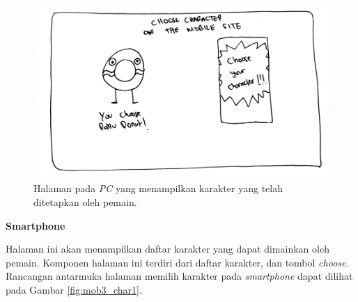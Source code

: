 \begin{enumerate}
\begin{figure}[H]
	\centering
	\includegraphics[scale=0.1]{Gambar/web3_char}
	\caption{Halaman pada \textit{PC} yang menampilkan karakter yang telah ditetapkan oleh pemain.}
	\label{fig:web3_char}
\end{figure}


	\textbf{Smartphone}
	
	Halaman ini akan menampilkan daftar karakter yang dapat dimainkan oleh pemain. Komponen halaman ini terdiri dari daftar karakter, dan tombol \textit{choose}. Rancangan antarmuka halaman memilih karakter pada \textit{smartphone} dapat dilihat pada Gambar \ref{fig:mob3_char1}.
	

\end{enumerate}

